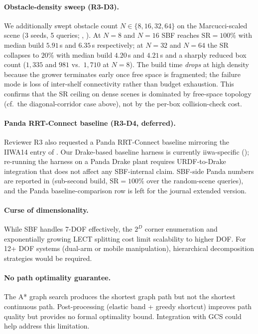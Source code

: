 \documentclass[journal]{IEEEtran}
\begin{document}
\paragraph{Obstacle-density sweep (R3-D3).}
We additionally swept obstacle count
$N\!\in\!\{8,16,32,64\}$ on the Marcucci-scaled scene
(3 seeds, 5 queries; ,
). At $N\!=\!8$ and $N\!=\!16$ SBF reaches
$\text{SR}=100\%$ with median build $5.91$\,s and $6.35$\,s
respectively; at $N\!=\!32$ and $N\!=\!64$ the SR collapses to
$20\%$ with median build $4.20$\,s and $4.21$\,s and a sharply
reduced box count ($1{,}335$ and $981$ vs.\ $1{,}710$ at $N\!=\!8$).
The build time \emph{drops} at high density because the grower
terminates early once free space is fragmented; the failure mode
is loss of inter-shelf connectivity rather than budget exhaustion.
This confirms that the SR ceiling on dense scenes is dominated by
free-space topology (cf.\ the diagonal-corridor case above), not by
the per-box collision-check cost.

\paragraph{Panda RRT-Connect baseline (R3-D4, deferred).}
Reviewer R3 also requested a Panda RRT-Connect baseline mirroring
the IIWA14 entry of . Our Drake-based
baseline harness is currently iiwa-specific
();
re-running the harness on a Panda Drake plant requires
URDF-to-Drake integration that does not affect any
SBF-internal claim. SBF-side Panda numbers are reported in
 (sub-second build, $\text{SR}=100\%$
over the random-scene queries), and the Panda
baseline-comparison row is left for the journal extended version.

\paragraph{Curse of dimensionality.}
While SBF handles 7-DOF effectively, the $2^D$ corner enumeration
and exponentially growing LECT splitting cost limit scalability
to higher DOF.
For 12+ DOF systems (dual-arm or mobile manipulation), hierarchical
decomposition strategies would be required.

\paragraph{No path optimality guarantee.}
The A* graph search produces the shortest graph path but not
the shortest continuous path.
Post-processing (elastic band + greedy shortcut) improves path quality
but provides no formal optimality bound.
Integration with GCS could help address this limitation.
\end{document}
